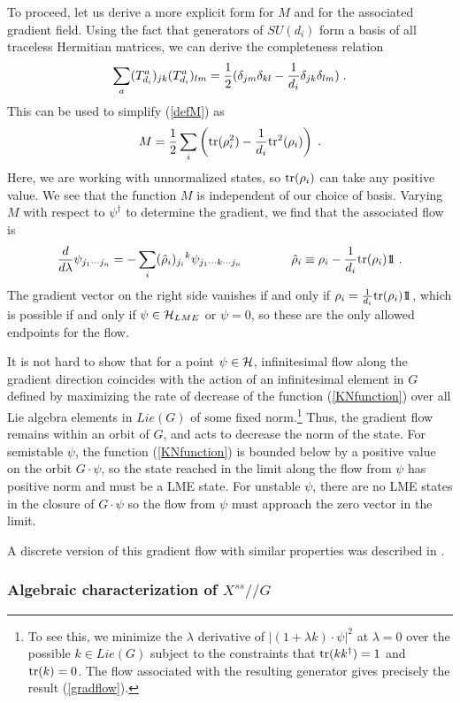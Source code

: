 \documentclass[12pt]{article}
\theoremstyle{definition}
\newcommand{\be}{\begin{equation}}
\newcommand{\ee}{\end{equation}}
\def\identity{{\rlap{1} \hskip 1.6pt \hbox{1}}}
\newcommand{\tr}{{\rm tr}}
\newcommand{\GITquot}{/\!/}
\begin{document}
To proceed, let us derive a more explicit form for $M$ and for the associated gradient field. Using the fact that generators of $SU(d_i)$ form a basis of all traceless Hermitian matrices, we can derive the completeness relation
\be
\sum_a (T^a_{d_i})_{jk} (T^a_{d_i})_{lm} = {1 \over 2} (\delta_{jm} \delta_{kl} - {1 \over d_i} \delta_{jk} \delta_{lm}) \; .
\ee
This can be used to simplify (\ref{defM}) as
\be
M = {1 \over 2} \sum_{i} \left(\tr(\rho_i^2) - {1 \over d_i} \tr^2(\rho_i)\right) \; .
\ee
Here, we are working with unnormalized states, so $\tr(\rho_i)$ can take any positive value. We see that the function $M$ is independent of our choice of basis. Varying $M$ with respect to $\psi^\dagger$ to determine the gradient, we find that the associated flow is
\be
\label{gradflow}
{d \over d \lambda} \psi_{j_1 \cdots j_n}  = - \sum_i  (\hat{\rho}_i)_{j_i} {}^{k} \psi_{j_1 \cdots k \cdots j_n} \qquad \qquad \hat{\rho}_i \equiv \rho_i - {1 \over d_i} \tr(\rho_i) \identity \; .
\ee
The gradient vector on the right side vanishes if and only if $\rho_i = {1 \over d_i} \tr(\rho_i) \identity$, which is possible if and only if $\psi \in {\cal H}_{LME}$ or $\psi = 0$, so these are the only allowed endpoints for the flow.

It is not hard to show that for a point $\psi \in {\cal H}$, infinitesimal flow along the gradient direction coincides with the action of an infinitesimal element in $G$ defined by maximizing the rate of decrease of the function (\ref{KNfunction}) over all Lie algebra elements in $Lie(G)$ of some fixed norm.\footnote{To see this, we minimize the $\lambda$ derivative of $|(1 + \lambda k) \cdot \psi|^2$ at $\lambda = 0$ over the possible $k \in Lie(G)$ subject to the constraints that $\tr(k k^\dagger) = 1$ and $\tr(k) = 0$. The flow associated with the resulting generator gives precisely the result (\ref{gradflow}).}  Thus, the gradient flow remains within an orbit of $G$, and acts to decrease the norm of the state. For semistable $\psi$, the function (\ref{KNfunction}) is bounded below by a positive value on the orbit $G \cdot \psi$, so the state reached in the limit along the flow from $\psi$ has positive norm and must be a LME state. For unstable $\psi$, there are no LME states in the closure of $G \cdot \psi$ so the flow from $\psi$ must approach the zero vector in the limit.

A discrete version of this gradient flow with similar properties was described in \cite{VDD}.

\subsubsection*{Algebraic characterization of $X^{ss}\GITquot G$}
\end{document}
